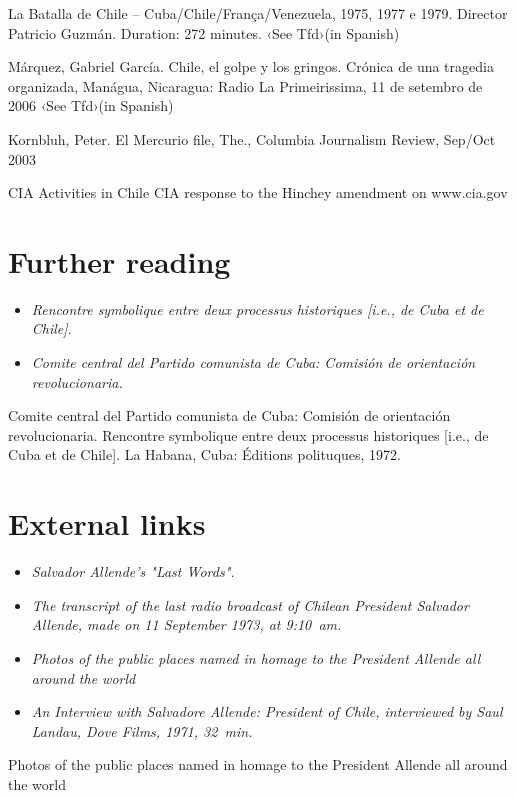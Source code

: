 La Batalla de Chile -- Cuba/Chile/França/Venezuela, 1975, 1977 e 1979.
Director Patricio Guzmán. Duration: 272 minutes. ‹See Tfd›(in Spanish)

Márquez, Gabriel García. Chile, el golpe y los gringos. Crónica de una
tragedia organizada, Manágua, Nicaragua: Radio La Primeirissima, 11 de
setembro de 2006 ‹See Tfd›(in Spanish)

Kornbluh, Peter. El Mercurio file, The., Columbia Journalism Review,
Sep/Oct 2003

CIA Activities in Chile CIA response to the Hinchey amendment on
www.cia.gov

\section{Further reading}\label{further-reading}

\begin{itemize}
\item
  \emph{Rencontre symbolique entre deux processus historiques {[}i.e.,
  de Cuba et de Chile{]}.}
\item
  \emph{Comite central del Partido comunista de Cuba: Comisión de
  orientación revolucionaria.}
\end{itemize}

Comite central del Partido comunista de Cuba: Comisión de orientación
revolucionaria. Rencontre symbolique entre deux processus historiques
{[}i.e., de Cuba et de Chile{]}. La Habana, Cuba: Éditions polituques,
1972.

\section{External links}\label{external-links}

\begin{itemize}
\item
  \emph{Salvador Allende's "Last Words".}
\item
  \emph{The transcript of the last radio broadcast of Chilean President
  Salvador Allende, made on 11 September 1973, at 9:10~am.}
\item
  \emph{Photos of the public places named in homage to the President
  Allende all around the world}
\item
  \emph{An Interview with Salvadore Allende: President of Chile,
  interviewed by Saul Landau, Dove Films, 1971, 32~min.}
\end{itemize}

Photos of the public places named in homage to the President Allende all
around the world

